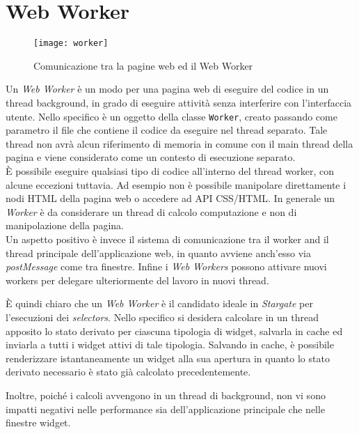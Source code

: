 \section{Web Worker}

\begin{figure}[H] 
  \centering 
  \texttt{[image: worker]} 
  \caption{Comunicazione tra la pagine web ed il Web Worker}
\end{figure}

Un \textit{Web Worker} è un modo per una pagina web di eseguire del codice in un thread background, in grado di eseguire attività senza interferire con l'interfaccia utente. Nello specifico è un oggetto della classe \texttt{Worker}, creato passando come parametro il file che contiene il codice da eseguire nel thread separato. Tale thread non avrà alcun riferimento di memoria in comune con il main thread della pagina e viene considerato come un contesto di esecuzione separato. \\

È possibile eseguire qualsiasi tipo di codice all'interno del thread worker, con alcune eccezioni tuttavia. Ad esempio non è possibile manipolare direttamente i nodi HTML della pagina web o accedere ad API CSS/HTML. In generale un \textit{Worker} è da considerare un thread di calcolo computazione e non di manipolazione della pagina. \\

Un aspetto positivo è invece il sistema di comunicazione tra il worker and il thread principale dell'applicazione web, in quanto avviene anch'esso via \textit{postMessage} come tra finestre. Infine i \textit{Web Workers} possono attivare nuovi workers per delegare ulteriormente del lavoro in nuovi thread.

È quindi chiaro che un \textit{Web Worker} è il candidato ideale in \textit{Stargate} per l'esecuzioni dei \textit{selectors}. Nello specifico si desidera calcolare in un thread apposito lo stato derivato per ciascuna tipologia di widget, salvarla in cache ed inviarla a tutti i widget attivi di tale tipologia. Salvando in cache, è possibile renderizzare istantaneamente un widget alla sua apertura in quanto lo stato derivato necessario è stato già calcolato precedentemente.

Inoltre, poiché i calcoli avvengono in un thread di background, non vi sono impatti negativi nelle performance sia dell'applicazione principale che nelle finestre widget. \\

